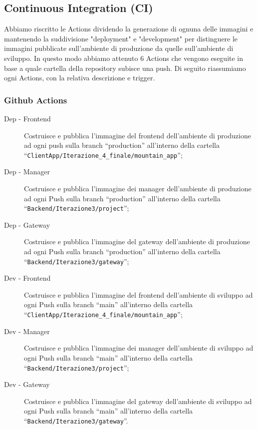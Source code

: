 \subsection{Continuous Integration (CI)}
Abbiamo riscritto le Actions dividendo la generazione di ognuna delle immagini e mantenendo la suddivisione "deployment" e "development" per distinguere le immagini pubblicate sull'ambiente di produzione da quelle sull'ambiente di sviluppo. In questo modo abbiamo attenuto 6 Actions che vengono eseguite in base a quale cartella della repository subisce una push. Di seguito riassumiamo ogni Actions, con la relativa descrizione e trigger.
\subsubsection{Github Actions}
\begin{description}
  \item[Dep - Frontend] Costruisce e pubblica l'immagine del frontend dell'ambiente di produzione ad ogni push sulla branch ``production'' all'interno della cartella\\``\verb|ClientApp/Iterazione_4_finale/mountain_app|'';
  \item[Dep - Manager] Costruisce e pubblica l'immagine dei manager dell'ambiente di produzione ad ogni Push sulla branch ``production'' all'interno della cartella\\``\verb|Backend/Iterazione3/project|'';
  \item[Dep - Gateway] Costruisce e pubblica l'immagine del gateway dell'ambiente di produzione ad ogni Push sulla branch ``production'' all'interno della cartella\\``\verb|Backend/Iterazione3/gateway|'';
  \item[Dev - Frontend] Costruisce e pubblica l'immagine del frontend dell'ambiente di sviluppo ad ogni Push sulla branch ``main'' all'interno della cartella\\``\verb|ClientApp/Iterazione_4_finale/mountain_app|'';
  \item[Dev - Manager] Costruisce e pubblica l'immagine dei manager dell'ambiente di sviluppo ad ogni Push sulla branch ``main'' all'interno della cartella\\``\verb|Backend/Iterazione3/project|'';
  \item[Dev - Gateway] Costruisce e pubblica l'immagine del gateway dell'ambiente di sviluppo ad ogni Push sulla branch ``main'' all'interno della cartella\\``\verb|Backend/Iterazione3/gateway|''.
\label{tab: github-actions-finali}
\end{description}
\newpage
